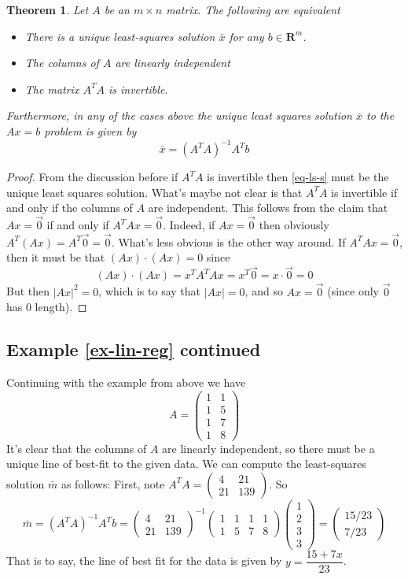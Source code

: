 \documentclass[12pt]{article}
\numberwithin{equation}{subsection}
\numberwithin{figure}{subsection}
\newtheorem{thm}[subsection]{Theorem}
\theoremstyle{note}
\newcommand{\R}{\mathbf{R}}
\newcommand\m[1]{\begin{pmatrix}#1\end{pmatrix}}
\begin{document}
\begin{thm}
	Let $A$ be an $m\times n$ matrix. The following are equivalent
	\begin{itemize}
		\item There is a unique least-squares solution $\bar{x}$ for any $b\in \R^m$.
		\item The columns of $A$ are linearly independent
		\item The matrix $A^TA$ is invertible. 
	\end{itemize}
Furthermore, in any of the cases above the unique least squares solution $\bar{x}$ to the $Ax=b$ problem is given by \begin{equation} \bar{x}=(A^TA)^{-1}A^Tb \label{eq-ls-s} \end{equation}
\end{thm}
\begin{proof}
From the discussion before if $A^TA$ is invertible then \eqref{eq-ls-s} must be the unique least squares solution. What's maybe not clear is that $A^TA$ is invertible if and only if the columns of $A$ are independent. This follows from the claim that $Ax=\vec{0}$ if and only if $A^TAx=\vec{0}$. Indeed, if $Ax=\vec{0}$ then obviously $A^T(Ax)=A^T\vec{0}=\vec{0}$. What's less obvious is the other way around. If $A^TAx=\vec{0}$, then it must be that $(Ax)\cdot(Ax)=0$ since \[ (Ax)\cdot(Ax) =x^TA^TAx=x^T\vec{0}=x\cdot \vec{0}=0\] But then $|Ax|^2=0$, which is to say that $|Ax|=0$, and so $Ax=\vec{0}$ (since only $\vec{0}$ has 0 length). 
\end{proof}

\subsection{Example \ref{ex-lin-reg} continued}

Continuing with the example from above we have \[ A=\m{1 & 1\\ 1 & 5 \\ 1 & 7 \\ 1 & 8}\] It's clear that the columns of $A$ are linearly independent, so there must be a unique line of best-fit to the given data. We can compute the least-squares solution $\bar{m}$ as follows:  First, note $A^TA=\m{4 & 21 \\ 21 & 139}$. So \[\bar{m}=(A^TA)^{-1}A^T b= \m{4 & 21 \\ 21 & 139}^{-1} \m{1 & 1 & 1 & 1 \\ 1 & 5 & 7 & 8} \m{1 \\ 2\\3\\3}=\m{15/23\\7/23}\]
That is to say, the line of best fit for the data is given by $y=\dfrac{15+7x}{23}$.
\end{document}
